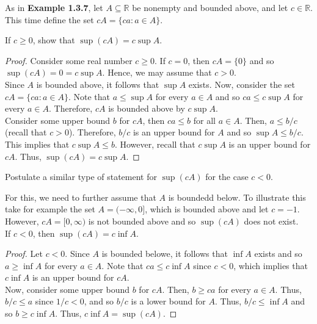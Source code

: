 \documentclass[12pt]{article}
\newcommand{\R}{\mathbb{R}}
\newenvironment{problem}[2][Problem]{\begin{trivlist}
		\item[\hskip \labelsep {\bfseries #1}\hskip \labelsep {\bfseries #2.}]}{\end{trivlist}}
\newenvironment{solution}[2][Solution]{\begin{trivlist}
		\item[\hskip \labelsep {\bfseries #1}\hskip \labelsep {\bfseries #2.}]}{\end{trivlist}}
\begin{document}
		\begin{problem}{1.3.5}
			As in \textbf{Example 1.3.7}, let $A\subseteq \R$ be nonempty and bounded above, and let $c\in \R$. This time define the set $cA = \{ca:a\in A\}$.
			\begin{enumerate}[label=(\alph*)]
				\item If $c\geq 0$, show that $\sup(cA) = c\sup A$.
				\begin{proof}
					Consider some real number $c\geq 0$. If $c=0$, then $cA = \{0\}$ and so $\sup (cA) = 0 = c\sup A$. Hence, we may assume that $c>0$.\\
					Since $A$ is bounded above, it follows that $\sup A$ exists. Now, consider the set $cA = \{ca:a\in A\}$. Note that $a\leq \sup A$ for every $a\in A$ and so $ca \leq c\sup A$ for every $a\in A$. Therefore, $cA$ is bounded above by $c\sup A$. \\
					
					Consider some upper bound $b$ for $cA$, then $ca \leq b$ for all $a\in A$. Then, $a\leq b/c$ (recall that $c>0$). Therefore, $b/c$ is an upper bound for $A$ and so $\sup A \leq b/c$. This implies that $c\sup A \leq b$. However, recall that $c\sup A$ is an upper bound for $cA$.
					Thus, $\sup (cA) = c\sup A$.
				\end{proof}
				\item Postulate a similar type of statement for $\sup(cA)$ for the case $c<0$.
				\begin{solution}{b}
					For this, we need to further assume that $A$ is boundedd below. To illustrate this take for example the set $A=(-\infty, 0]$, which is bounded above and let $c=-1$. However, $cA = [0,\infty)$ is not bounded above and so $\sup (cA)$ does not exist. \\
					
					If $c<0$, then $\sup(cA) = c\inf
					A$.
					\begin{proof}
						Let $c<0$. Since $A$ is bounded belowe, it follows that  $\inf A$ exists and so $a\geq \inf A$ for every $a\in A$. Note that $ca\leq c\inf A$ since $c<0$, which implies that $c\inf A$ is an upper bound for $cA$.\\
						Now, consider some upper bound $b$ for $cA$. Then, $b\geq ca$ for every $a\in A$. Thus, $b/c \leq a$ since $1/c < 0$, and so $b/c$ is a lower bound for $A$. Thus, $b/c \leq \inf A$ and so $b \geq c\inf A$. Thus, $c\inf A = \sup (cA)$. 
					\end{proof}
				\end{solution}
			\end{enumerate}
		\end{problem}
\end{document}
